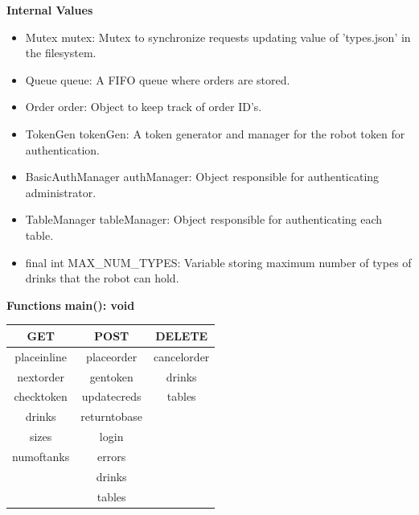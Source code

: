 \documentclass [10pt]{article}
\begin{document}
\textbf{Internal Values}
\begin{itemize}
	\item Mutex mutex: Mutex to synchronize requests updating value of 'types.json' in the filesystem.
	\item Queue queue: A FIFO queue where orders are stored.
	\item Order order: Object to keep track of order ID's.
	\item TokenGen tokenGen: A token generator and manager for the robot token for authentication.
	\item BasicAuthManager authManager: Object responsible for authenticating administrator.
	\item TableManager tableManager: Object responsible for authenticating each table.
	\item final int MAX\_NUM\_TYPES: Variable storing maximum number of types of drinks that the robot can hold.
\end{itemize}

\textbf{Functions}
\textbf{main(): void}

\begin{center}
	\begin{tabular}{ |c|c|c| } 
		\hline
		\textbf{GET} & \textbf{POST} & \textbf{DELETE} \\ \hline
		placeinline & placeorder & cancelorder \\ \hline
		nextorder & gentoken & drinks \\ \hline
		checktoken & updatecreds & tables \\ \hline
		drinks & returntobase &  \\ \hline
		sizes & login &  \\ \hline
		numoftanks & errors &  \\ \hline
		& drinks &  \\ \hline
		& tables &  \\ \hline
	\end{tabular}
\end{center}
\end{document}
